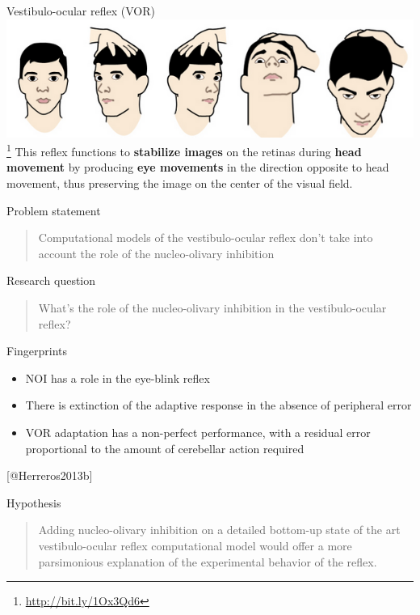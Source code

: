 \begin{frame}{Vestibulo-ocular reflex (VOR)}
	\includegraphics{images/vor.png}
	\footnote{\url{http://bit.ly/1Ox3Qd6}}
	This reflex functions to \textbf{stabilize images} on the retinas during \textbf{head movement} by producing \textbf{eye movements} in the direction opposite to head movement, thus preserving the image on the center of the visual field.
\end{frame}


\begin{frame}{Problem statement}
	\begin{quote}
		Computational models of the vestibulo-ocular reflex don't take into account the role of the nucleo-olivary inhibition
	\end{quote}
\end{frame}


\begin{frame}{Research question}
	\begin{quote}
		What's the role of the nucleo-olivary inhibition in the vestibulo-ocular reflex?
	\end{quote}
	\begin{block}{Fingerprints}
		\begin{itemize}
			\item NOI has a role in the eye-blink reflex
			\item There is extinction of the adaptive response in the absence of peripheral error
			\item VOR adaptation has a non-perfect performance, with a residual error proportional to the amount of cerebellar action required
		\end{itemize}
	[@Herreros2013b]
	\end{block}
\end{frame}


\begin{frame}{Hypothesis}
	\begin{quote}
		Adding nucleo-olivary inhibition on a detailed bottom-up state of the art vestibulo-ocular reflex computational model would offer a more
		parsimonious explanation of the experimental behavior of the reflex.
	\end{quote}
\end{frame}



